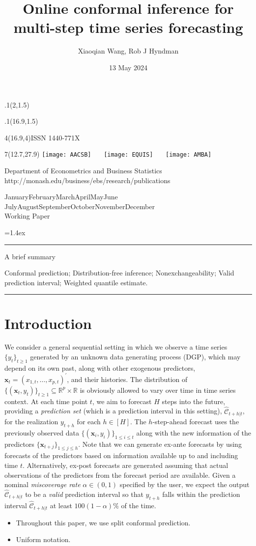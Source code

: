 \documentclass[
  11pt,
  a4paper,
]{article}
\title{Online conformal inference for multi-step time series
forecasting}
\date{13 May 2024}
\author{Xiaoqian Wang, Rob J Hyndman}
\makeatletter
\theoremstyle{plain}
\theoremstyle{plain}
\theoremstyle{remark}
\def\placefig#1#2#3#4{\begin{textblock}{.1}(#1,#2)\rlap{\texttt{[image: \#4]}}\end{textblock}}
\def\Date{\number\day}
\def\Month{\ifcase\month\or
 January\or February\or March\or April\or May\or June\or
 July\or August\or September\or October\or November\or December\fi}
\def\Year{\number\year}
\def\showjel{{\large\textsf{\textbf{JEL classification:}}~\@jel}}
\def\cover{{\sffamily\setcounter{page}{0}
        \thispagestyle{empty}
        \placefig{2}{1.5}{width=5cm}{monash2}
        \placefig{16.9}{1.5}{width=2.1cm}{MBSportrait}
        \begin{textblock}{4}(16.9,4)ISSN 1440-771X\end{textblock}
        \begin{textblock}{7}(12.7,27.9)\hfill
        \texttt{[image: AACSB]}~~~
        \texttt{[image: EQUIS]}~~~
        \texttt{[image: AMBA]}
        \end{textblock}
        \vspace*{2.5cm}
        \begin{center}\Large
        Department of Econometrics and Business Statistics\\[.5cm]
        \footnotesize http://monash.edu/business/ebs/research/publications
        \end{center}\vspace{2cm}
        \begin{center}
        \fbox{\parbox{14cm}{\begin{onehalfspace}\centering\Huge\vspace*{0.3cm}
                \textsf{\textbf{\expandafter{\@title}}}\vspace{1cm}\par
                \LARGE
                \expandafter{\@author}
                \end{onehalfspace}
        }}
        \end{center}
        \vfill
                \begin{center}\Large
                \Month~\Year\\[1cm]
                Working Paper \@wp
        \end{center}\vspace*{2cm}}}
\def\pageone{{\sffamily\setstretch{1}%
        \thispagestyle{empty}%
        \vbox to \textheight{%
        \raggedright\baselineskip=1.2cm
     {\fontsize{24.88}{30}\sffamily\textbf{\expandafter{\@title}}}
        \vspace{2cm}\par
        \hspace{1cm}\parbox{14cm}{\sffamily\large\@addresses}\vspace{1cm}\vfill
        \hspace{1cm}{\large\Date~\Month~\Year}\\[1cm]
        \hspace{1cm}\showjel\vss}}}
\def\blindtitle{{\sffamily
     \thispagestyle{plain}\raggedright\baselineskip=1.2cm
     {\fontsize{24.88}{30}\sffamily\textbf{\expandafter{\@title}}}\vspace{1cm}\par
        }}
\def\titlepage{{\cover\newpage\pageone\newpage\blindtitle}}
\let\maketitle\titlepage
\newenvironment{keywords}{\par\vspace{0.5cm}\noindent{\sffamily\textbf{Keywords:}}}{\vspace{0.25cm}\par\hrule\vspace{0.5cm}\par}
\renewenvironment{abstract}{\begin{minipage}{\textwidth}\parskip=1.4ex\noindent
\hrule\vspace{0.1cm}\par{\sffamily\textbf{\abstractname}}\newline\setstretch{1}}
  {\end{minipage}}
\makeatother
\begin{document}
\maketitle

\begin{abstract}
A brief summary
\end{abstract}

\begin{keywords}
  Conformal prediction; Distribution-free
inference; Nonexchangeability; Valid prediction interval; 
  Weighted quantile estimate.
\end{keywords}

\section{Introduction}\label{sec-intro}

We consider a general sequential setting in which we observe a time
series \(\{y_t\}_{t \geq 1}\) generated by an unknown data generating
process (DGP), which may depend on its own past, along with other
exogenous predictors, \(\bm{x}_t=(x_{1,t},\ldots,x_{p,t})^{\prime}\),
and their histories. The distribution of
\(\{(\bm{x}_t, y_t)\}_{t \geq 1} \subseteq \mathbb{R}^p \times \mathbb{R}\)
is obviously allowed to vary over time in time series context. At each
time point \(t\), we aim to forecast \(H\) steps into the future,
providing a \emph{prediction set} (which is a prediction interval in
this setting), \(\hat{\mathcal{C}}_{t+h|t}\), for the realization
\(y_{t+h}\) for each \(h\in[H]\). The \(h\)-step-ahead forecast uses the
previously observed data \(\{(\bm{x}_i, y_i)\}_{1 \leq i \leq t}\) along
with the new information of the predictors
\(\{\bm{x}_{t+j}\}_{1\leq j\leq h}\). Note that we can generate ex-ante
forecasts by using forecasts of the predictors based on information
available up to and including time \(t\). Alternatively, ex-post
forecasts are generated assuming that actual observations of the
predictors from the forecast period are available. Given a nominal
\emph{miscoverage rate} \(\alpha \in (0,1)\) specified by the user, we
expect the output \(\hat{\mathcal{C}}_{t+h|t}\) to be a \emph{valid}
prediction interval so that \(y_{t+h}\) falls within the prediction
interval \(\hat{\mathcal{C}}_{t+h|t}\) at least \(100(1-\alpha)\%\) of
the time.

\begin{itemize}
\item
  Throughout this paper, we use split conformal prediction.
\item
  Uniform notation.
\end{itemize}
\end{document}
